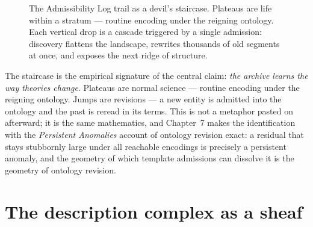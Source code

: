 \documentclass[11pt,oneside]{book}
\theoremstyle{remark}
\begin{document}
\begin{figure}[ht]
\centering
{}
\caption{The Admissibility Log trail as a devil's staircase. Plateaus
are life within a stratum --- routine encoding under the reigning
ontology. Each vertical drop is a cascade triggered by a single
admission: discovery flattens the landscape, rewrites thousands of old
segments at once, and exposes the next ridge of structure.}
\label{fig:staircase}
\end{figure}

The staircase is the empirical signature of the central claim:
\emph{the archive learns the way theories change}. Plateaus are normal
science --- routine encoding under the reigning ontology. Jumps are
revisions --- a new entity is admitted into the ontology and the past
is reread in its terms. This is not a metaphor pasted on afterward; it
is the same mathematics, and Chapter~7 makes the identification with the
\emph{Persistent Anomalies} account of ontology revision exact: a
residual that stays stubbornly large under all reachable encodings is
precisely a persistent anomaly, and the geometry of which template
admissions can dissolve it is the geometry of ontology revision.

\section{The description complex as a sheaf}
\end{document}
